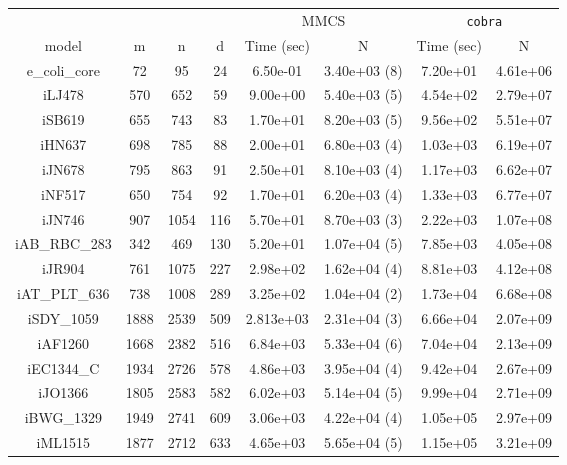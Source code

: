    \begin{table}[t]
      \centering
      \small
      \begin{tabular}{|c||c|c|c||c|c||c|c|}\hline
         &  & & & \multicolumn{2}{c}{MMCS} &   \multicolumn{2}{c}{\texttt{cobra}} \\
      model & m & n & d & Time (sec)  & N  & Time (sec)  & N \\ \hline
      e\_coli\_core & 72 & 95 &  24 & 6.50e-01 & 3.40e+03 (8)   & 7.20e+01  & 4.61e+06  \\     %
      iLJ478 & 570 & 652 & 59  & 9.00e+00 & 5.40e+03 (5)  & 4.54e+02  & 2.79e+07 \\                   %
      iSB619 & 655 & 743 & 83 & 1.70e+01 &  8.20e+03 (5)  & 9.56e+02  & 5.51e+07  \\
      iHN637 & 698 & 785 & 88  & 2.00e+01 & 6.80e+03 (4)  & 1.03e+03  & 6.19e+07  \\
      iJN678 & 795 & 863 & 91 & 2.50e+01 & 8.10e+03 (4)  & 1.17e+03  & 6.62e+07 \\                  %
      iNF517  & 650 & 754 & 92  & 1.70e+01 & 6.20e+03 (4)  & 1.33e+03  & 6.77e+07  \\
      iJN746  & 907 & 1054 & 116 & 5.70e+01 & 8.70e+03 (3)  & 2.22e+03  & 1.07e+08 \\              %
      iAB\_RBC\_283  & 342 & 469 & 130 & 5.20e+01 &  1.07e+04 (5)  & 7.85e+03  & 4.05e+08  \\
      iJR904  & 761 & 1075 &  227  & 2.98e+02 & 1.62e+04 (4) & 8.81e+03  & 4.12e+08   \\
      iAT\_PLT\_636   & 738 & 1008 & 289  & 3.25e+02  & 1.04e+04 (2)  & 1.73e+04  & 6.68e+08 \\
      iSDY\_1059 & 1888 & 2539 & 509 & 2.813e+03 & 2.31e+04 (3) & 6.66e+04  & 2.07e+09 \\
      iAF1260 & 1668 & 2382 & 516 & 6.84e+03 & 5.33e+04 (6)  & 7.04e+04  & 2.13e+09 \\
      iEC1344\_C  & 1934 & 2726 & 578  & 4.86e+03 & 3.95e+04 (4) & 9.42e+04   & 2.67e+09 \\
      iJO1366  & 1805 & 2583 & 582 & 6.02e+03 & 5.14e+04 (5)  & 9.99e+04  & 2.71e+09 \\
      iBWG\_1329 & 1949 & 2741 & 609 & 3.06e+03 & 4.22e+04 (4) & 1.05e+05   & 2.97e+09 \\
      iML1515 & 1877 & 2712 & 633 &  4.65e+03 & 5.65e+04 (5)  & 1.15e+05   & 3.21e+09 \\

\end{tabular}
\end{table}
